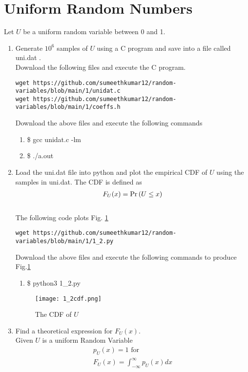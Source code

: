 \documentclass[journal,12pt,twocolumn]{IEEEtran}
\begin{document}
\section{Uniform Random Numbers}
Let $U$ be a uniform random variable between 0 and 1.
\begin{enumerate}[label=\thesection.\arabic*
,ref=\thesection.\theenumi]
\item Generate $10^6$ samples of $U$ using a C program and save into a file called uni.dat .
\\
\solution Download the following files and execute the  C program.
\begin{lstlisting}
wget https://github.com/sumeethkumar12/random-variables/blob/main/1/unidat.c
wget https://github.com/sumeethkumar12/random-variables/blob/main/1/coeffs.h
\end{lstlisting}
Download the above files and execute the following commands
\begin{enumerate}
    \item \$ gcc unidat.c -lm
    \item \$ ./a.out
\end{enumerate}
\item
Load the uni.dat file into python and plot the empirical CDF of $U$ using the samples in uni.dat. The CDF is defined as
\begin{align}
F_{U}(x) = \Pr\left(U \le x\right)
\end{align}
\\
\solution  The following code plots Fig. \ref{fig:1.2}
\begin{lstlisting}
wget https://github.com/sumeethkumar12/random-variables/blob/main/1/1_2.py
\end{lstlisting}
Download the above files and execute the following commands to produce Fig.\ref{fig:1.2}
\begin{enumerate}
    \item \$ python3 1\_2.py
\end{enumerate}
\begin{figure}[!h]
\centering
\texttt{[image: 1\_2cdf.png]}
\caption{The CDF of $U$}
\label{fig:1.2}
\end{figure}
%
\item
Find a  theoretical expression for $F_{U}(x)$.\\
\solution Given $U$ is a uniform Random Variable
\begin{align}
p_{U}(x)=1 \text{ for } \\
F_U(x)=\int_{-\infty}^{\infty}p_{U}(x)dx\\

\end{align}
\end{enumerate}
\end{document}
